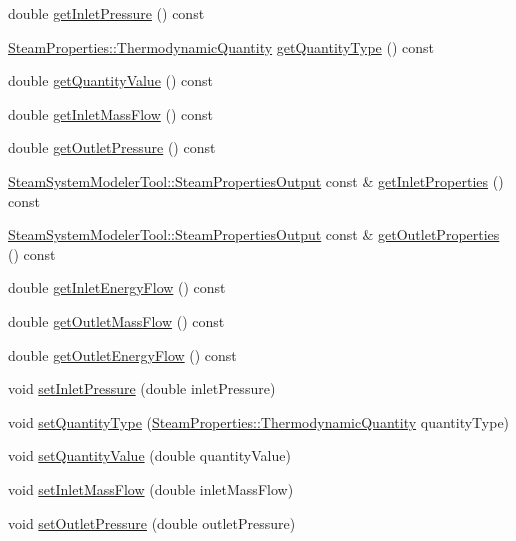 \begin{DoxyCompactItemize}
\item 
double \hyperlink{class_prv_without_desuperheating_a4b1244b479abfaef01abbb62395dff13}{get\+Inlet\+Pressure} () const
\item 
\hyperlink{class_steam_properties_ae0294bedf7d178c2d8fb6aed0f62fbff}{Steam\+Properties\+::\+Thermodynamic\+Quantity} \hyperlink{class_prv_without_desuperheating_ad465c855f0c7271110ed2cb2ebccf081}{get\+Quantity\+Type} () const
\item 
double \hyperlink{class_prv_without_desuperheating_a1113c254f45d08588b0afe4bd1273530}{get\+Quantity\+Value} () const
\item 
double \hyperlink{class_prv_without_desuperheating_a0ae2ed88cc8bd4e69cddc05ef1225811}{get\+Inlet\+Mass\+Flow} () const
\item 
double \hyperlink{class_prv_without_desuperheating_ae1d335703442deec2f2c2f93e4c862f2}{get\+Outlet\+Pressure} () const
\item 
\hyperlink{struct_steam_system_modeler_tool_1_1_steam_properties_output}{Steam\+System\+Modeler\+Tool\+::\+Steam\+Properties\+Output} const  \& \hyperlink{class_prv_without_desuperheating_aefb61f9d9dd99216459f6948308d11e9}{get\+Inlet\+Properties} () const
\item 
\hyperlink{struct_steam_system_modeler_tool_1_1_steam_properties_output}{Steam\+System\+Modeler\+Tool\+::\+Steam\+Properties\+Output} const  \& \hyperlink{class_prv_without_desuperheating_afcf1f5d7e6b18643ac8adc9023578147}{get\+Outlet\+Properties} () const
\item 
double \hyperlink{class_prv_without_desuperheating_a040dbe6a11a722f15450cd00ac454c48}{get\+Inlet\+Energy\+Flow} () const
\item 
double \hyperlink{class_prv_without_desuperheating_a12c0bf1f0c29e56e6e07ece3fe865c1b}{get\+Outlet\+Mass\+Flow} () const
\item 
double \hyperlink{class_prv_without_desuperheating_ab13245e86b90832de0b4190163236551}{get\+Outlet\+Energy\+Flow} () const
\item 
void \hyperlink{class_prv_without_desuperheating_a26039a0a228ca66f96e8402bf741b9d9}{set\+Inlet\+Pressure} (double inlet\+Pressure)
\item 
void \hyperlink{class_prv_without_desuperheating_a212177b7a16c7452358df4120196c04b}{set\+Quantity\+Type} (\hyperlink{class_steam_properties_ae0294bedf7d178c2d8fb6aed0f62fbff}{Steam\+Properties\+::\+Thermodynamic\+Quantity} quantity\+Type)
\item 
void \hyperlink{class_prv_without_desuperheating_a5ed2d0f0f558705d482ed0502131757f}{set\+Quantity\+Value} (double quantity\+Value)
\item 
void \hyperlink{class_prv_without_desuperheating_abeccff2dc91144452b34ca343ee63fa7}{set\+Inlet\+Mass\+Flow} (double inlet\+Mass\+Flow)
\item 
void \hyperlink{class_prv_without_desuperheating_a0f2a4597b58390e5c4a7c75b38bbebbc}{set\+Outlet\+Pressure} (double outlet\+Pressure)
\end{DoxyCompactItemize}


